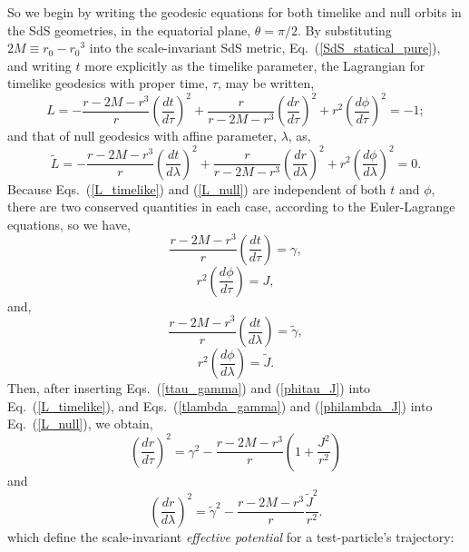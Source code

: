 So we begin by writing the geodesic equations for both timelike and null orbits in the SdS geometries, in the equatorial plane, $\theta=\pi/2$. By substituting $2M\equiv{r_0}-{r_0}^3$ into the scale-invariant SdS metric, Eq.~(\ref{SdS_statical_pure}), and writing $t$ more explicitly as the timelike parameter, the Lagrangian for timelike geodesics with proper time, $\tau$, may be written,
\begin{equation}
L=-\frac{r-2M-r^3}{r}\left(\frac{dt}{d\tau}\right)^2+\frac{r}{r-2M-r^3}\left(\frac{dr}{d\tau}\right)^2+r^2\left(\frac{d\phi}{d\tau}\right)^2=-1; \label{L_timelike}
\end{equation}
and that of null geodesics with affine parameter, $\lambda$, as,
\begin{equation}
\tilde{L}=-\frac{r-2M-r^3}{r}\left(\frac{dt}{d\lambda}\right)^2+\frac{r}{r-2M-r^3}\left(\frac{dr}{d\lambda}\right)^2+r^2\left(\frac{d\phi}{d\lambda}\right)^2=0. \label{L_null}
\end{equation}
Because Eqs.~(\ref{L_timelike}) and (\ref{L_null}) are independent of both $t$ and $\phi$, there are two conserved quantities in each case, according to the Euler-Lagrange equations, so we have,
\begin{equation}
\frac{r-2M-r^3}{r}\left(\frac{dt}{d\tau}\right)=\gamma,\label{ttau_gamma}
\end{equation}
\begin{equation}
r^2\left(\frac{d\phi}{d\tau}\right)=J,\label{phitau_J}
\end{equation}
and,
\begin{equation}
\frac{r-2M-r^3}{r}\left(\frac{dt}{d\lambda}\right)=\tilde{\gamma},\label{tlambda_gamma}
\end{equation}
\begin{equation}
r^2\left(\frac{d\phi}{d\lambda}\right)=\tilde{J}.\label{philambda_J}
\end{equation}
Then, after inserting Eqs.~(\ref{ttau_gamma}) and (\ref{phitau_J}) into Eq.~(\ref{L_timelike}), and Eqs.~(\ref{tlambda_gamma}) and (\ref{philambda_J}) into Eq.~(\ref{L_null}), we obtain,
\begin{equation}
\left(\frac{dr}{d\tau}\right)^2=\gamma^2-\frac{r-2M-r^3}{r}\left(1+\frac{J^2}{r^2}\right)\label{rtau_J}
\end{equation}
and
\begin{equation}
\left(\frac{dr}{d\lambda}\right)^2=\tilde{\gamma}^2-\frac{r-2M-r^3}{r}\frac{\tilde{J}^2}{r^2}.\label{rlambda_J}
\end{equation}
which define the scale-invariant \textit{effective potential} for a test-particle's trajectory:
